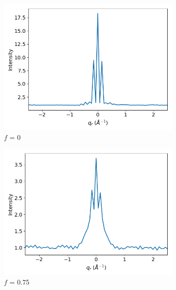 \documentclass[journal=jpcbfk,manuscript=article]{achemso}
\begin{document}
  \begin{figure}
  \centering
  \begin{subfigure}{0.3\textwidth}
  \includegraphics[width=\textwidth]{sf_qy_sr0.png}
  \caption{$f$ = 0}\label{fig:sf_qy_sr0}
  \end{subfigure}
  \begin{subfigure}{0.3\textwidth}
  \includegraphics[width=\textwidth]{sf_qy_sr75.png}
  \caption{$f$ = 0.75}\label{fig:sf_qy_sr75}
  \end{subfigure}
  \begin{subfigure}{0.3\textwidth}

\end{subfigure}
\end{figure}
\end{document}
